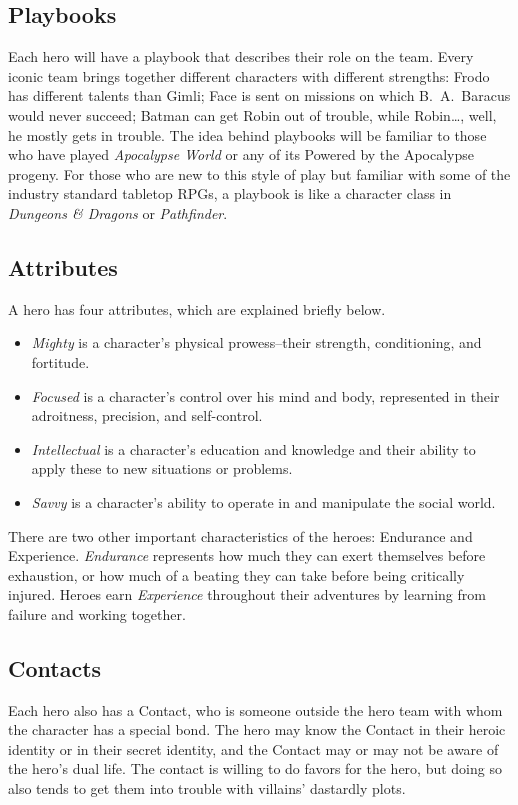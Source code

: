 \documentclass[letterpaper]{report}
\begin{document}
\subsection*{Playbooks}

Each hero will have a playbook that describes their role on the team.
Every iconic team brings together different characters with
different strengths: Frodo has different talents than Gimli;
Face is sent on missions on which B.\ A.\ Baracus would never succeed;
Batman can get Robin out of trouble, while Robin\ldots{}, well,
he mostly gets in trouble.
The idea behind playbooks will be familiar to those
who have played \textit{Apocalypse World}
or any of its Powered by the Apocalypse progeny.
For those who are new to this style of play but familiar with
some of the industry standard tabletop RPGs, a playbook is like
a character class in \textit{Dungeons \& Dragons} or \textit{Pathfinder}.

\subsection*{Attributes}
A hero has four attributes, which are explained briefly below.
\begin{itemize}
\item \emph{Mighty} is a character's physical prowess--their strength,
  conditioning, and fortitude.
\item \emph{Focused} is a character's control over his mind and body,
  represented in their adroitness, precision, and self-control.
\item \emph{Intellectual} is a character's education and knowledge and their
  ability to apply these to new situations or problems.
\item \emph{Savvy} is a character's ability to operate in and manipulate
  the social world.
\end{itemize}

There are two other important characteristics of the heroes:
Endurance and Experience.
\emph{Endurance} represents how much they can
exert themselves before exhaustion, or how much of a beating they can
take before being critically injured.
Heroes earn \emph{Experience} throughout their adventures
by learning from failure and working together.

\subsection*{Contacts}
Each hero also has a Contact, who is someone outside the hero team
with whom the character has a special bond.
The hero may know the Contact in their heroic identity or in their
secret identity, and the Contact may or may not be aware of the
hero's dual life.
The contact is willing to do favors for the hero, but doing so also tends
to get them into trouble with villains' dastardly plots.
\end{document}
